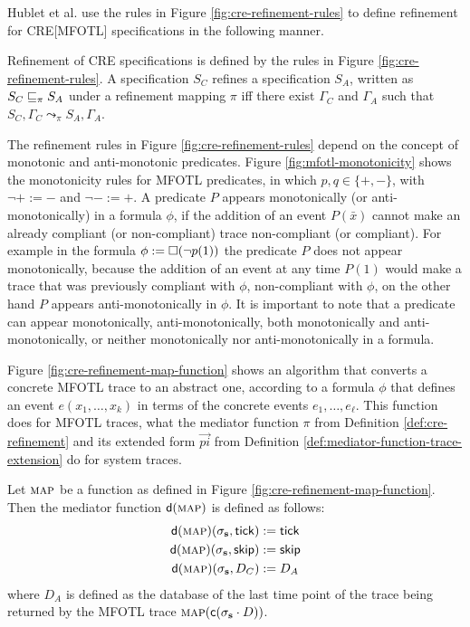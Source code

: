 Hublet et al. \cite{lex} use the rules in Figure \ref{fig:cre-refinement-rules}
to define refinement for CRE[MFOTL] specifications in the following manner.
\begin{definition}
    \label{def:cre-refinement}
    Refinement of CRE specifications is defined by
    the rules in Figure \ref{fig:cre-refinement-rules}.
    A specification $S_C$ refines a specification $S_A$, written as
    $S_C \sqsubseteq_\pi S_A$
    under a refinement mapping $\pi$
    iff there exist $\Gamma_C$ and $\Gamma_A$ such that
    $S_C, \Gamma_C \leadsto_\pi S_A, \Gamma_A$.
\end{definition}
The refinement rules in Figure \ref{fig:cre-refinement-rules} depend on the concept of
monotonic and anti-monotonic predicates.
Figure \ref{fig:mfotl-monotonicity} shows the monotonicity rules for
MFOTL predicates, in which $p,q \in \{+,-\}$, with $\neg + := -$ and $\neg - := +$.
A predicate $P$ appears monotonically (or anti-monotonically) in a
formula $\phi$, if the addition of an event $P(\bar{x})$ cannot make
an already compliant (or non-compliant) trace non-compliant (or compliant).
For example in the formula $\phi := \operatorname{\square} (\neg p(1))$ the
predicate $P$ does not appear monotonically,
because the addition of an event at any time $P(1)$ would make a trace that
was previously compliant with $\phi$, non-compliant with $\phi$,
on the other hand $P$ appears anti-monotonically in $\phi$.
It is important to note that a predicate can appear monotonically, anti-monotonically,
both monotonically and anti-monotonically, or neither monotonically nor
anti-monotonically in a formula.

Figure \ref{fig:cre-refinement-map-function} shows an
algorithm that converts a concrete MFOTL trace
to an abstract one, according to a formula $\phi$
that defines an event $e(x_1,\dots,x_k)$
in terms of the concrete events $e_1,\dots,e_\ell$.
This function does for MFOTL traces, what the
mediator function $\pi$ from Definition
\ref{def:cre-refinement} and its extended form
$\vec{pi}$ from Definition
\ref{def:mediator-function-trace-extension} do for system traces.

\begin{definition}
    \label{def:mfotl-map-function-to-mediator-function}
    Let $\textsc{\textsf{map}}$ be a function as
    defined in Figure \ref{fig:cre-refinement-map-function}.
    Then the mediator function $\mathsf{d}(\textsc{\textsf{map}})$
    is defined as follows:
    \begin{align*}
        \mathsf{d}(\textsc{\textsf{map}})(\sigma_{\mathbf{s}}, \mathsf{tick}) &:= \mathsf{tick} \\
        \mathsf{d}(\textsc{\textsf{map}})(\sigma_{\mathbf{s}}, \mathsf{skip}) &:= \mathsf{skip} \\
        \mathsf{d}(\textsc{\textsf{map}})(\sigma_{\mathbf{s}}, D_C) &:= D_A
    \end{align*}
    where $D_A$ is defined as the database of
    the last time point of the trace being returned
    by the MFOTL trace
    $\textsc{\textsf{map}}(\mathsf{c}(\sigma_{\mathbf{s}} \cdot D))$.
\end{definition}

